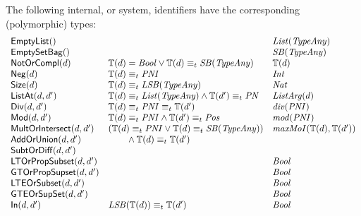 \documentclass[fleqn,a4paper]{article}
\newcommand{\aterm}[1]{\mathsf{#1}}
\newcommand{\type}{\mathbb{T}}
\newcommand{\PNI}{\nm{PNI}}
\newcommand{\PN}{\nm{PN}}
\newcommand{\SB}{\nm{SB}}
\newcommand{\LSB}{\nm{LSB}}
\newcommand{\List}{\nm{List}}
\newcommand{\TypeAny}{\nm{TypeAny}}
\newcommand{\typecompat}{\equiv_t}
\newcommand{\Int}{\nm{Int}}
\newcommand{\Pos}{\nm{Pos}}
\begin{document}
The following internal, or system, identifiers have the corresponding (polymorphic) types:
\begin{displaymath}
\begin{array}{lll}
\aterm{EmptyList}()                  &                                                            & \List(\TypeAny)\\
\aterm{EmptySetBag}()                &                                                            & \SB(\TypeAny)\\
\aterm{NotOrCompl}(d)                & \type(d)=\Bool\lor\type(d)\typecompat\SB(\TypeAny)         & \type(d)\\
\aterm{Neg}(d)                       & \type(d)\typecompat\PNI                                    & \Int\\
\aterm{Size}(d)                      & \type(d)\typecompat\LSB(\TypeAny)                          & \Nat\\
\aterm{ListAt}(d, d')                & \type(d)\typecompat\List(\TypeAny)\land\type(d')\typecompat\PN & \nm{ListArg}(d)\\
\aterm{Div}(d, d')                   & \type(d)\typecompat\PNI\typecompat\type(d')                & \nm{div}(\PNI)\\
\aterm{Mod}(d, d')                   & \type(d)\typecompat\PNI\land\type(d')\typecompat\Pos       & \nm{mod}(\PNI)\\
\aterm{MultOrIntersect}(d, d')       & (\type(d)\typecompat\PNI\lor\type(d)\typecompat\SB(\TypeAny))
                                                                                                  & \nm{maxMoI}(\type(d),\type(d'))\\
\aterm{AddOrUnion}(d, d')            & \t2\land\type(d)\typecompat\type(d')                          &\\
\aterm{SubtOrDiff}(d, d')            &                                                            &\\
\aterm{LTOrPropSubset}(d, d')        &                                                            & \Bool\\
\aterm{GTOrPropSupset}(d, d')        &                                                            & \Bool\\
\aterm{LTEOrSubset}(d, d')           &                                                            & \Bool\\
\aterm{GTEOrSupSet}(d, d')           &                                                            & \Bool\\
\aterm{In}(d, d')                    & \LSB(\type(d))\typecompat\type(d')                         & \Bool\\

\end{array}
\end{displaymath}
\end{document}
